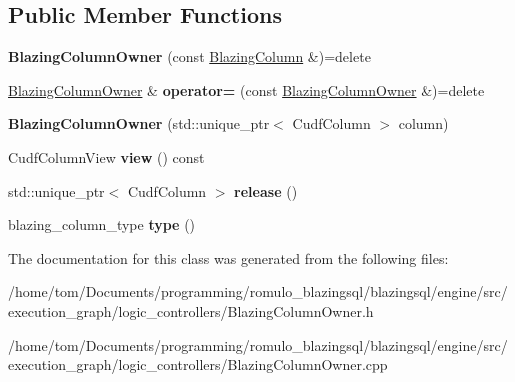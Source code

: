 \subsection*{Public Member Functions}
\begin{DoxyCompactItemize}
\item 
\mbox{\label{classral_1_1frame_1_1BlazingColumnOwner_a917c09bd16079fc64a19f5b8e68a4c00}} 
{\bfseries Blazing\+Column\+Owner} (const \hyperlink{classral_1_1frame_1_1BlazingColumn}{Blazing\+Column} \&)=delete
\item 
\mbox{\label{classral_1_1frame_1_1BlazingColumnOwner_a6d49038ec53dc7a35fec3727d91852fa}} 
\hyperlink{classral_1_1frame_1_1BlazingColumnOwner}{Blazing\+Column\+Owner} \& {\bfseries operator=} (const \hyperlink{classral_1_1frame_1_1BlazingColumnOwner}{Blazing\+Column\+Owner} \&)=delete
\item 
\mbox{\label{classral_1_1frame_1_1BlazingColumnOwner_a435fa4fe80fd584647f3381ca578db88}} 
{\bfseries Blazing\+Column\+Owner} (std\+::unique\+\_\+ptr$<$ Cudf\+Column $>$ column)
\item 
\mbox{\label{classral_1_1frame_1_1BlazingColumnOwner_ae9fc48497fb4ef45777d66c6888311f6}} 
Cudf\+Column\+View {\bfseries view} () const
\item 
\mbox{\label{classral_1_1frame_1_1BlazingColumnOwner_aa103e63483906f95a701d83bbb94fd82}} 
std\+::unique\+\_\+ptr$<$ Cudf\+Column $>$ {\bfseries release} ()
\item 
\mbox{\label{classral_1_1frame_1_1BlazingColumnOwner_a9fa77ce1e4bff77a021b623e5f891833}} 
blazing\+\_\+column\+\_\+type {\bfseries type} ()
\end{DoxyCompactItemize}


The documentation for this class was generated from the following files\+:\begin{DoxyCompactItemize}
\item 
/home/tom/\+Documents/programming/romulo\+\_\+blazingsql/blazingsql/engine/src/execution\+\_\+graph/logic\+\_\+controllers/Blazing\+Column\+Owner.\+h\item 
/home/tom/\+Documents/programming/romulo\+\_\+blazingsql/blazingsql/engine/src/execution\+\_\+graph/logic\+\_\+controllers/Blazing\+Column\+Owner.\+cpp\end{DoxyCompactItemize}
